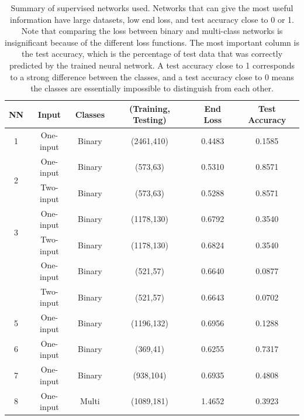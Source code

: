 \documentclass[a4paper]{article}
\begin{document}
\begin{table}[h!]
\centering
\begin{tabular}{||c c c c c c||} 
 \hline
 NN & Input & Classes & (Training, Testing) & End Loss & Test Accuracy \\ [0.5ex] 
 \hline\hline
 1 & One-input & Binary & (2461,410) & 0.4483 & 0.1585 \\
 \multirow{2}{*}{\hfil 2} & One-input & Binary & (573,63) & 0.5310 & 0.8571 \\ 
  & Two-input & Binary & (573,63) & 0.5288 & 0.8571 \\ 
  \multirow{2}{*}{\hfil 3} & One-input & Binary & (1178,130) & 0.6792 & 0.3540 \\ 
  & Two-input & Binary & (1178,130) & 0.6824 & 0.3540 \\
 \rowcolor{pink}
  & One-input & Binary & (521,57) & 0.6640 & 0.0877 \\
  \rowcolor{pink}
 \multirow{-2}{*}{\hfil \hyperlink{sup3}{4}}& Two-input & Binary & (521,57) & 0.6643 & 0.0702 \\
 5 & One-input & Binary & (1196,132) & 0.6956 & 0.1288 \\
 6 & One-input & Binary & (369,41) & 0.6255 & 0.7317 \\
 7 & One-input & Binary & (938,104) & 0.6935 & 0.4808 \\
 \rowcolor{pink}
 8 & One-input & Multi & (1089,181) & 1.4652 & 0.3923 \\
 \hline
\end{tabular}
\caption{Summary of supervised networks used. Networks that can give the most useful information have large datasets, low end loss, and test accuracy close to 0 or 1. Note that comparing the loss between binary and multi-class networks is insignificant because of the different loss functions. The most important column is the test accuracy, which is the percentage of test data that was correctly predicted by the trained neural network. A test accuracy close to 1 corresponds to a strong difference between the classes, and a test accuracy close to 0 means the classes are essentially impossible to distinguish from each other. }
\label{table:1}
\end{table}
\end{document}
